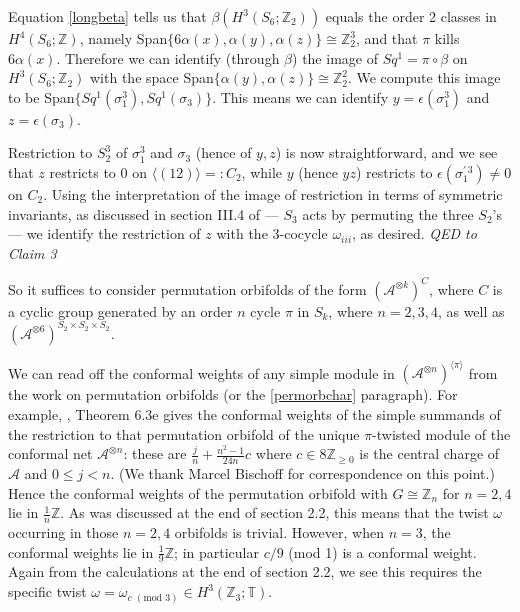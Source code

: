 \documentclass[12pt]{article}
\numberwithin{equation}{section}
\def\cA            {{\mathcal{A}}}
\def\bbT           {\mathbb{T}}
\def\bbZ           {\mathbb{Z}}
\begin{document}
Equation \eqref{longbeta} tells us that $\beta(H^3(S_6;\bbZ_2))$ equals the order 2 classes in $H^4(S_6;\bbZ)$, namely Span$\{ 6\alpha(x),\alpha(y),\alpha(z)\}\cong\bbZ_2^3$, and that $\pi$ kills  $6\alpha(x)$.
Therefore we can identify (through $\beta$) the image of $Sq^1=\pi\circ\beta$ on $H^3(S_6;\bbZ_2)$ with the space Span$\{ \alpha(y),\alpha(z)\}\cong \bbZ_2^2$. We compute this image to be Span$\{Sq^1(\sigma_1^3),Sq^1(\sigma_3)\}$. This means we can identify $y=\epsilon(\sigma_1^3)$ and
$z=\epsilon(\sigma_3)$.

Restriction to $S_2^3$ of $\sigma_1^3$ and $\sigma_3$ (hence of $y,z$) is now straightforward,
and we see that $z$ restricts to 0  on $\langle (12)\rangle=:C_2$, while $y$ (hence $yz$) restricts to  $\epsilon(\sigma_1^{\prime\, 3})\ne 0$  on $C_2$. Using the interpretation of the image of restriction in terms of symmetric invariants, as discussed in section III.4 of \cite{AM} --- $S_3$ acts by permuting the three $S_2$'s --- we identify the restriction of $z$ with the 3-cocycle
$\omega_{iii}$, as desired. \textit{QED to Claim 3}\medskip




So it suffices to consider permutation orbifolds of the form  $(\cA^{\otimes k})^C$, where $C$ is a cyclic group generated by an order $n$ cycle $\pi$ in $S_k$, where $n=2,3,4$, as well as $(\cA^{\otimes 6})^{S_2\times S_2\times S_2}$.



We can read off the conformal weights of any simple module in $(\cA^{\otimes n})^{\langle\pi\rangle}$ from the work \cite{BHS,Ba,BDM,LX,KLX} on permutation orbifolds (or the \eqref{permorbchar} paragraph). For example, {\cite{LX}, Theorem 6.3e} gives the conformal weights of the simple summands of the restriction to that permutation orbifold of the unique $\pi$-twisted module of the conformal net $\cA^{\otimes n}$: these are $\frac{j}{n}+\frac{n^2-1}{24n}c$ where $c\in 8\bbZ_{\ge 0}$
is the central charge of $\cA$ and $0\le j<n$. (We thank Marcel Bischoff for correspondence on this point.)  Hence the conformal weights of the permutation orbifold with
$G\cong\bbZ_n$ for $n=2,4$  lie in $\frac{1}{n}\bbZ$. As was discussed at the end of section 2.2, this means that the twist $\omega$ occurring in those $n=2,4$ orbifolds is trivial. However, when $n=3$, 
the conformal weights  lie in $\frac{1}{9}\bbZ$; in particular $c/9$ (mod 1) is a conformal weight.
Again from the calculations at the end of section 2.2, we see this requires the specific twist $\omega=\omega_{c\,\, (\mathrm{mod}\,\, 3)}\in H^3(\bbZ_3;\bbT)$.
\end{document}
